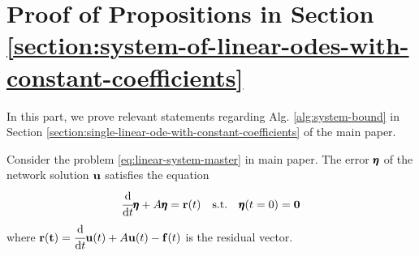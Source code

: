 \chapter{Proof of Propositions in Section \ref{section:system-of-linear-odes-with-constant-coefficients}}
\label{appendix:proof-of-bounds-for-ode-systems}

In this part, we prove relevant statements regarding Alg. \ref{alg:system-bound} in Section \ref{section:single-linear-ode-with-constant-coefficients} of the main paper.

Consider the problem \eqref{eq:linear-system-master} in main paper. 
The error $\pmb{\eta}$ of the network solution $\mathbf{u}$ satisfies the equation
\begin{equation}\label{eq:system-err-equation}
    \cfrac{\mathrm{d} }{\mathrm{d} t} \pmb{\eta} + A\pmb{\eta} = \mathbf{r}(t) \quad \text{s.t.} \quad \pmb{\eta}(t=0) = \mathbf{0}
\end{equation}
where $\mathbf{r(t)} = \cfrac{\mathrm{d} }{\mathrm{d} t}\mathbf{u}(t) + A\mathbf{u}(t) - \mathbf{f}(t)$ is the residual vector.

